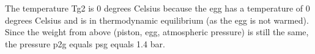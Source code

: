 The temperature Tg2 is 0 degrees Celsius because the egg has a temperature of 0 degrees Celsius and is in thermodynamic equilibrium (as the egg is not warmed). Since the weight from above (piston, egg, atmospheric pressure) is still the same, the pressure p2g equals psg equals 1.4 bar.